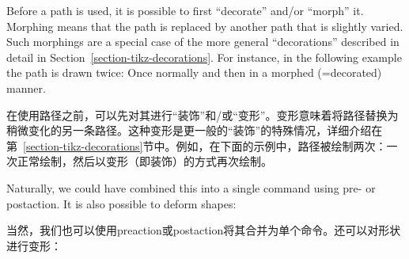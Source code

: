 Before a path is used, it is possible to first ``decorate'' and/or ``morph''
it. Morphing means that the path is replaced by another path that is slightly
varied. Such morphings are a special case of the more general ``decorations''
described in detail in Section~\ref{section-tikz-decorations}. For instance, in
the following example the path is drawn twice: Once normally and then in a
morphed (=decorated) manner.

在使用路径之前，可以先对其进行“装饰”和/或“变形”。变形意味着将路径替换为稍微变化的另一条路径。这种变形是更一般的“装饰”的特殊情况，详细介绍在第~\ref{section-tikz-decorations}节中。例如，在下面的示例中，路径被绘制两次：一次正常绘制，然后以变形（即装饰）的方式再次绘制。


\begin{codeexample}[preamble={\usetikzlibrary{decorations.pathmorphing}}]
\end{codeexample}

Naturally, we could have combined this into a single command using pre- or
postaction. It is also possible to deform shapes:

当然，我们也可以使用preaction或postaction将其合并为单个命令。还可以对形状进行变形：

\begin{codeexample}[preamble={\usetikzlibrary{decorations.pathmorphing,shadows}}]
\end{codeexample}
